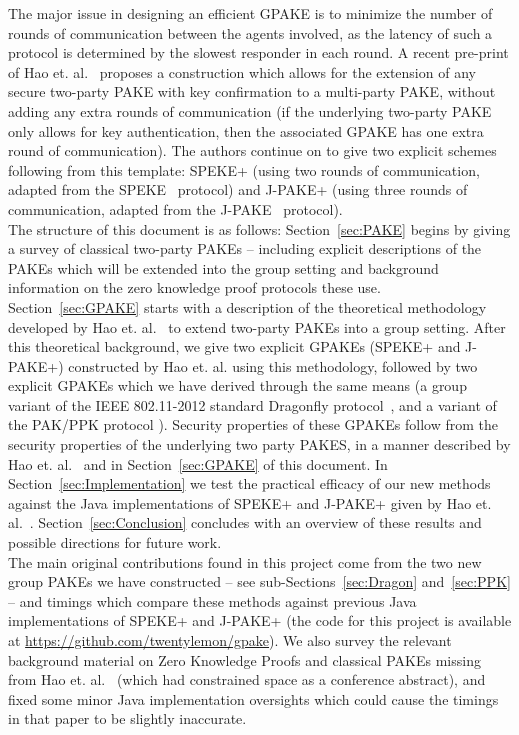 \documentclass{amsart}
\theoremstyle{remark}
\begin{document}
The major issue in designing an efficient GPAKE is to minimize the number of rounds of communication 
between the agents involved, as the latency of such a protocol is determined by the slowest responder 
in each round.  A recent pre-print of Hao et. al.~\cite{HaYiChSh15} proposes a construction which 
allows for the extension of any secure two-party PAKE  with key confirmation to a multi-party PAKE,
without adding any extra rounds of communication (if the underlying two-party PAKE only allows for
key authentication, then the associated GPAKE has one extra round of communication).  The authors continue 
on to give two explicit schemes following from this template: SPEKE+ (using two rounds of communication, 
adapted from the SPEKE~\cite{Ja96} protocol) and J-PAKE+ (using three rounds of communication, adapted from 
the J-PAKE~\cite{HaRy2010} protocol).
\\ 

The structure of this document is as follows: Section~\ref{sec:PAKE} begins by giving a survey of classical 
two-party PAKEs -- including explicit descriptions of the PAKEs which will be extended into the group 
setting and background information on the zero knowledge proof protocols these use.  Section~\ref{sec:GPAKE} 
starts with a description of the theoretical methodology developed by Hao et. al.~\cite{HaYiChSh15} to extend 
two-party PAKEs into a group setting.  After this theoretical background, we give two explicit GPAKEs 
(SPEKE+ and J-PAKE+) constructed by Hao et. al. using this methodology, followed by two explicit GPAKEs 
which we have derived through the same means (a group variant of the IEEE 802.11-2012 standard Dragonfly 
protocol~\cite{Ha15}, and a variant of the PAK/PPK protocol \cite{BoMaPa00}).  Security properties of these
GPAKEs follow from the security properties of the underlying two party PAKES, in a manner described by Hao et. al.~\cite{HaYiChSh15} 
and in Section~\ref{sec:GPAKE} of this document.  In Section~\ref{sec:Implementation} we test the practical efficacy of our new methods 
against the Java implementations of SPEKE+ and J-PAKE+ given by Hao et. al.~\cite{HaYiChSh15}.  Section~\ref{sec:Conclusion} 
concludes with an overview of these results and possible directions for future work.
\\ 

The main original contributions found in this project come from the two new group PAKEs we have constructed 
-- see sub-Sections~\ref{sec:Dragon} and~\ref{sec:PPK} -- and timings 
which compare these methods against previous Java implementations of SPEKE+ and J-PAKE+ (the code for this project is 
available at \url{https://github.com/twentylemon/gpake}).  
We also survey the relevant background material on Zero Knowledge Proofs and classical PAKEs missing from
Hao et. al.~\cite{HaYiChSh15} (which had constrained space as a conference abstract), and fixed some minor 
Java implementation oversights which could cause the timings in that paper to be slightly inaccurate.
\end{document}
